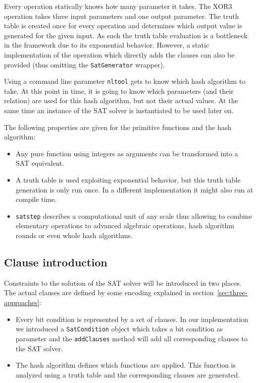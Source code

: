 Every operation statically knows how many parameter it takes. The XOR3 operation takes three input parameters and one output parameter. The truth table is created once for every operation and determines which output value is generated for the given input. As such the truth table evaluation is a bottleneck in the framework due to its exponential behavior. However, a static implementation of the operation which directly adds the clauses can also be provided (thus omitting the \texttt{SatGenerator} wrapper).

Using a command line parameter \texttt{nltool} gets to know which hash algorithm to take. At this point in time, it is going to know which parameters (and their relation) are used for this hash algorithm, but not their actual values. At the same time an instance of the SAT solver is instantiated to be used later on.

The following properties are given for the primitive functions and the hash algorithm:
\begin{itemize}
  \item Any pure function using integers as arguments can be transformed into a SAT equivalent.
  \item A truth table is used exploiting exponential behavior, but this truth table generation is only run once. In a different implementation it might also run at compile time.
  \item \texttt{satstep} describes a computational unit of any scale thus allowing to combine elementary operations to advanced algebraic operations, hash algorithm rounds or even whole hash algorithms.
\end{itemize}

\subsection{Clause introduction}
\label{sec:clause-introduction}
%
Constraints to the solution of the SAT solver will be introduced in two places. The actual clauses are defined by some encoding explained in section~\ref{sec:three-approaches}:
\begin{itemize}
  \item Every bit condition is represented by a set of clauses. In our implementation we introduced a \texttt{SatCondition} object which takes a bit condition as parameter and the \texttt{addClauses} method will add all corresponding clauses to the SAT solver.
  \item The hash algorithm defines which functions are applied. This function is analyzed using a truth table and the corresponding clauses are generated.
\end{itemize}

